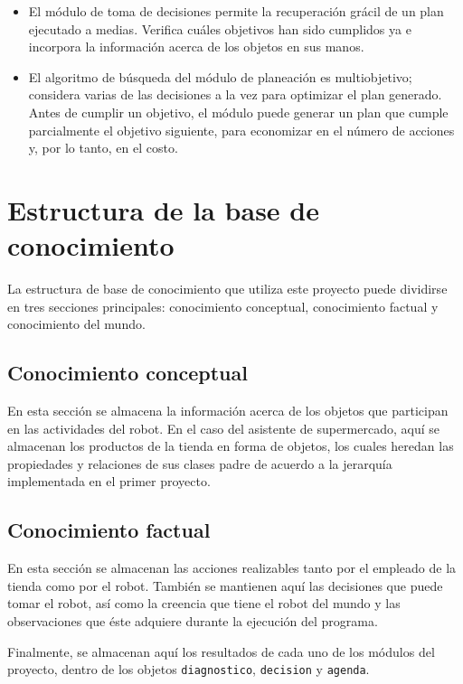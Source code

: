 \documentclass[11pt]{article}
\begin{document}
\begin{itemize}
    \item El módulo de toma de decisiones permite la recuperación grácil de un plan ejecutado a medias. Verifica cuáles objetivos han sido cumplidos ya e incorpora la información acerca de los objetos en sus manos.
    \item El algoritmo de búsqueda del módulo de planeación es multiobjetivo; considera varias de las decisiones a la vez para optimizar el plan generado. Antes de cumplir un objetivo, el módulo puede generar un plan que cumple parcialmente el objetivo siguiente, para economizar en el número de acciones y, por lo tanto, en el costo.
\end{itemize}

\section{Estructura de la base de conocimiento}

La estructura de base de conocimiento que utiliza este proyecto puede dividirse en tres secciones principales: conocimiento conceptual, conocimiento factual y conocimiento del mundo.

\subsection{Conocimiento conceptual}

En esta sección se almacena la información acerca de los objetos que participan en las actividades del robot. En el caso del asistente de supermercado, aquí se almacenan los productos de la tienda en forma de objetos, los cuales heredan las propiedades y relaciones de sus clases padre de acuerdo a la jerarquía implementada en el primer proyecto.

\subsection{Conocimiento factual}

En esta sección se almacenan las acciones realizables tanto por el empleado de la tienda como por el robot. También se mantienen aquí las decisiones que puede tomar el robot, así como la creencia que tiene el robot del mundo y las observaciones que éste adquiere durante la ejecución del programa.

Finalmente, se almacenan aquí los resultados de cada uno de los módulos del proyecto, dentro de los objetos \texttt{diagnostico}, \texttt{decision} y \texttt{agenda}.
\end{document}
